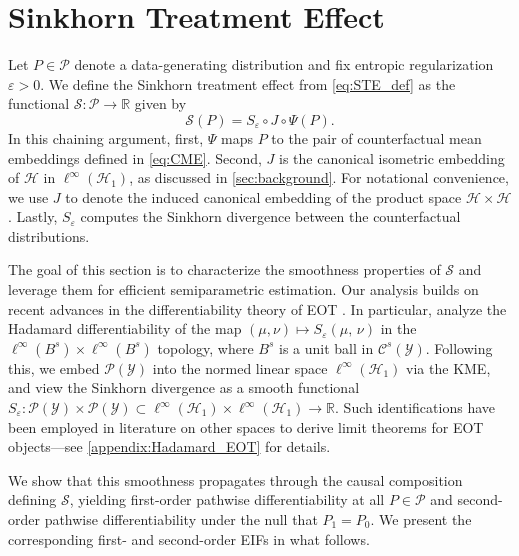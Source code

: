 \documentclass{article}
\theoremstyle{plain}
\theoremstyle{definition}
\theoremstyle{remark}
\newcommand{\R}{\mathbb{R}}
\newcommand{\of}[1]{\left(#1\right)}
\newcommand{\cH}{\mathcal{H}}
\newcommand{\cP}{\mathcal{P}}
\newcommand{\cC}{\mathcal{C}}
\newcommand{\cY}{\mathcal{Y}}
\newcommand{\1}{\mathbbm{1}}
\newcommand{\SinkDiv}[2]{{S}_\eps\of{#1,\, #2}}
\newcommand{\STE}{\mathscr{S}}
\newcommand{\eps}{\varepsilon}
\theoremstyle{plain}
\theoremstyle{definition}
\begin{document}
\section{Sinkhorn Treatment Effect}\label{sec:STE}


Let $P\in\cP$ denote a data-generating distribution and fix entropic regularization $\eps>0$. We define the {Sinkhorn treatment effect} from \eqref{eq:STE_def} as the functional $\STE: \cP \to \R$ given by
\begin{equation*}
    \STE(P)=S_\eps \circ J \circ \Psi (P).
\end{equation*}
In this chaining argument, first, $\Psi$ maps $P$ to the pair of counterfactual mean embeddings defined in \eqref{eq:CME}. Second, $J$ is the canonical isometric embedding of $\cH$ in $\ell^\infty(\cH_1)$, as discussed in \cref{sec:background}. For notational convenience, we use $J$ to denote the induced canonical embedding of the product space $\cH \times \cH$. Lastly, $S_\eps$ computes the Sinkhorn divergence between the counterfactual distributions. 

The goal of this section is to characterize the smoothness properties of $\STE$ and leverage them for efficient semiparametric estimation. Our analysis builds on recent advances in the differentiability theory of EOT \cite{goldfeld2024limit, kokot2025coreset}. In particular, \citet{goldfeld2024limit} analyze the Hadamard differentiability of the map $(\mu,\nu) \mapsto \SinkDiv{\mu}{\nu}$ in the $\ell^\infty(B^s) \times \ell^\infty(B^s)$ topology, where $B^s$ is a unit ball in $\cC^s(\cY)$. Following this, we embed $\cP(\cY)$ into the normed linear space $\ell^\infty(\cH_1)$ via the KME, and view the Sinkhorn divergence as a smooth functional $S_\eps: \cP(\cY) \times \cP(\cY) \subset \ell^\infty(\cH_1)\times \ell^\infty(\cH_1) \to \R$. Such identifications have been employed in literature on other spaces to derive limit theorems for EOT objects---see \cref{appendix:Hadamard_EOT} for details.


We show that this smoothness propagates through the causal composition defining $\STE$, yielding first-order pathwise differentiability at all $P\in \cP$ and second-order pathwise differentiability under the null that $P_1 = P_0$. We present the corresponding first- and second-order EIFs in what follows. 
\end{document}
